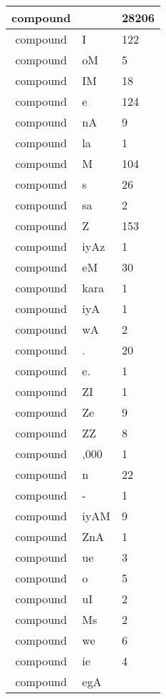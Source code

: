\documentclass[a4 paper]{article}
\begin{document}
\begin{longtable}{cp{}p{}}
compound &  & 28206\\ \midrule compound & I & 122\\ \midrule compound & oM & 5\\ \midrule compound & IM & 18\\ \midrule compound & e & 124\\ \midrule compound & nA & 9\\ \midrule compound & la & 1\\ \midrule compound & M & 104\\ \midrule compound & s & 26\\ \midrule compound & sa & 2\\ \midrule compound & Z & 153\\ \midrule compound & iyAz & 1\\ \midrule compound & eM & 30\\ \midrule compound & kara & 1\\ \midrule compound & iyA & 1\\ \midrule compound & wA & 2\\ \midrule compound & . & 20\\ \midrule compound & e. & 1\\ \midrule compound & ZI & 1\\ \midrule compound & Ze & 9\\ \midrule compound & ZZ & 8\\ \midrule compound & ,000 & 1\\ \midrule compound & n & 22\\ \midrule compound & - & 1\\ \midrule compound & iyAM & 9\\ \midrule compound & ZnA & 1\\ \midrule compound & ue & 3\\ \midrule compound & o & 5\\ \midrule compound & uI & 2\\ \midrule compound & Ms & 2\\ \midrule compound & we & 6\\ \midrule compound & ie & 4\\ \midrule compound & egA & 
\end{longtable}
\end{document}

